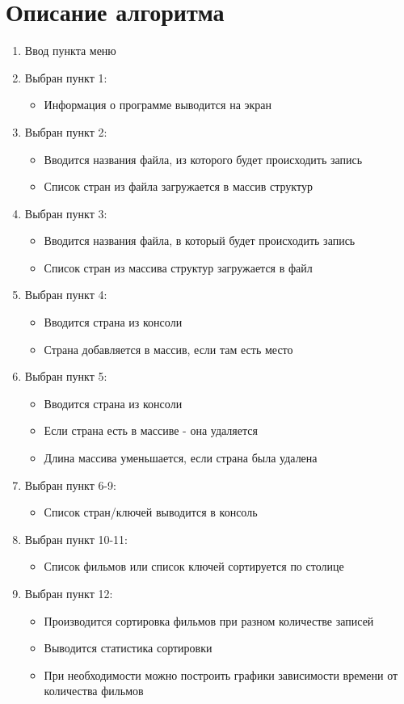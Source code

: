 \section{Описание алгоритма}
\begin{enumerate}
	\item Ввод пункта меню
	\item Выбран пункт 1:
	\begin{itemize}
		\item Информация о программе выводится на экран
	\end{itemize}
	\item Выбран пункт 2:
	\begin{itemize}
		\item Вводится названия файла, из которого будет происходить запись
		\item Список стран из файла загружается в массив структур
	\end{itemize}
	\item Выбран пункт 3:
	\begin{itemize}
		\item Вводится названия файла, в который будет происходить запись
		\item Список стран из массива структур загружается в файл
	\end{itemize}
	\item Выбран пункт 4:
	\begin{itemize}
		\item Вводится страна из консоли
		\item Страна добавляется в массив, если там есть место
	\end{itemize}
	\item Выбран пункт 5:
	\begin{itemize}
		\item Вводится страна из консоли
		\item Если страна есть в массиве - она удаляется
		\item Длина массива уменьшается, если страна была удалена
	\end{itemize}
	\item Выбран пункт 6-9:
	\begin{itemize}
		\item Список стран/ключей выводится в консоль
	\end{itemize}
	\item Выбран пункт 10-11:
	\begin{itemize}
		\item Список фильмов или список ключей сортируется по столице
	\end{itemize}
	\item Выбран пункт 12:
	\begin{itemize}
		\item Производится сортировка фильмов при разном количестве записей
		\item Выводится статистика сортировки
		\item При необходимости можно построить графики зависимости времени от количества фильмов
	\end{itemize}
\end{enumerate}
